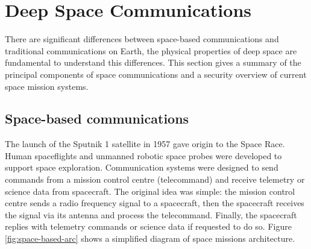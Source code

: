 \section{Deep Space Communications}
\label{sec:space}

There are significant differences between space-based communications and traditional communications on Earth, the physical properties of deep space are fundamental to understand this differences. This section gives a summary of the principal components of space communications and a security overview of current space mission systems. 



\subsection{Space-based communications}

The launch of the Sputnik 1 satellite in 1957 gave origin to the Space Race. Human spaceflights and unmanned robotic space probes were developed to support space exploration. Communication systems were designed to send commands from a mission control centre (telecommand) and receive telemetry or science data from spacecraft. The original idea was simple: the mission control centre sends a radio frequency signal to a spacecraft, then the spacecraft receives the signal via its antenna and process the telecommand. Finally, the spacecraft replies with telemetry commands or science data if requested to do so. Figure \ref{fig:space-based-arc} shows a simplified diagram of space missions architecture.  



